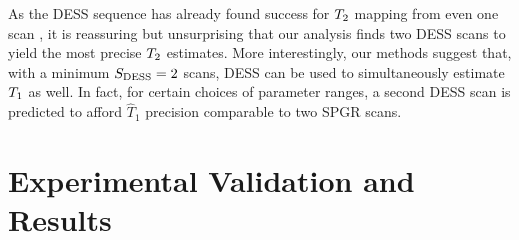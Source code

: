 As the DESS sequence has already found success 
for $T_2$ mapping from even one scan \cite{welsch:09:reo}, 
it is reassuring but unsurprising that our analysis finds two DESS scans 
to yield the most precise $T_2$ estimates. 
More interestingly, 
our methods suggest that, 
with a minimum $S_{\mathrm{DESS}} = 2$ scans, 
DESS can be used to simultaneously estimate $T_1$ as well. 
In fact, for certain choices of parameter ranges, 
a second DESS scan is predicted 
to afford $\widehat{T}_1$ precision 
comparable to two SPGR scans. 

\section{Experimental Validation and Results}
\label{s,scn-dsgn,exp}

